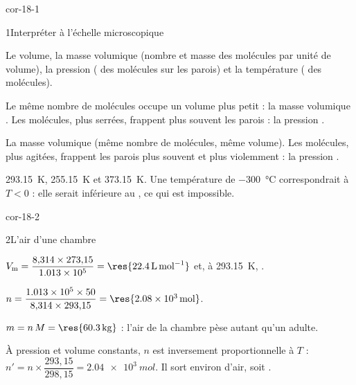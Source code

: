 \corrigesSouples

\begin{blocLivre}{cor-18-1}
\begin{corrige}{1}{Interpréter à l'échelle microscopique}
\begin{questions}
\item Le volume, la masse volumique (nombre et masse des molécules par unité de volume), la pression ( des
molécules sur les parois) et la température ( des molécules).
\item Le même nombre de molécules occupe un volume plus petit : la masse volumique . Les molécules,
plus serrées, frappent plus souvent les parois : la pression .
\item La masse volumique  (même nombre de molécules, même volume). Les molécules, plus agitées,
frappent les parois plus souvent et plus violemment : la pression .
\item \qty{293,15}{K}, \qty{255,15}{K} et \qty{373,15}{K}. Une température de \qty{-300}{\degreeCelsius} correspondrait à
$T<0$ : elle serait inférieure au , ce qui est impossible.
\end{questions}
\end{corrige}
\end{blocLivre}
\begin{blocLivre}{cor-18-2}
\begin{corrige}{2}{L'air d'une chambre}
\begin{questions}
\item $V_\mathrm{m}=\dfrac{8{,}314\times273{,}15}{\num{1.013e5}}=\res{\qty{22,4}{L.mol^{-1}}}$ et, à \qty{293,15}{K},
.
\item $n=\dfrac{\num{1.013e5}\times50}{8{,}314\times293{,}15}=\res{\qty{2,08e3}{mol}}$.
\item $m=n\,M=\res{\qty{60,3}{kg}}$ : l'air de la chambre pèse autant qu'un adulte.
\item À pression et volume constants, $n$ est inversement proportionnelle à $T$ : $n'=n\times\dfrac{293{,}15}{298{,}15}=\qty{2,04e3}{mol}$.
Il sort environ  d'air, soit .
\end{questions}
\end{corrige}
\end{blocLivre}
